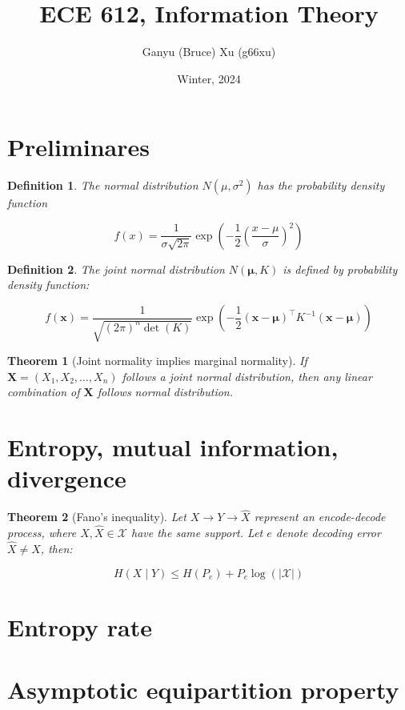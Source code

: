 \documentclass{article}
\title{ECE 612, Information Theory}
\author{Ganyu (Bruce) Xu (g66xu)}
\date{Winter, 2024}
\newcommand{\norm}[1]{\vert {#1} \vert}
\newtheorem{definition}{Definition}[section]
\newtheorem{theorem}{Theorem}[section]
\begin{document}
\maketitle

\section*{Preliminares}
\begin{definition}
    The normal distribution $N(\mu, \sigma^2)$ has the probability density function

    $$
    f(x) = \frac{1}{\sigma\sqrt{2\pi}}\exp(-\frac{1}{2}(\frac{x-\mu}{\sigma})^2)
    $$
\end{definition}

\begin{definition}
    The joint normal distribution $N(\mathbf{\mu}, K)$ is defined by probability density function:

    $$
    f(\mathbf{x}) = \frac{1}{\sqrt{(2\pi)^n\det(K)}}
    \exp(-\frac{1}{2}
        (\mathbf{x} - \mathbf{\mu})^\intercal
        K^{-1}
        (\mathbf{x} - \mathbf{\mu})
    )
    $$
\end{definition}

\begin{theorem}[Joint normality implies marginal normality]
    If $\mathbf{X} = (X_1, X_2, \ldots, X_n)$ follows a joint normal distribution, then any linear combination of $\mathbf{X}$ follows normal distribution.
\end{theorem}

\section{Entropy, mutual information, divergence}

\begin{theorem}[Fano's inequality]
    Let $X \rightarrow Y \rightarrow \hat{X}$ represent an encode-decode process, where $X, \hat{X} \in \mathcal{X}$ have the same support. Let $e$ denote decoding error $\hat{X} \neq X$, then:

    $$
    H(X \mid Y) \leq H(P_e) + P_e \log(\norm{\mathcal{X}})
    $$
\end{theorem}

\section{Entropy rate}

\section{Asymptotic equipartition property}
\end{document}
